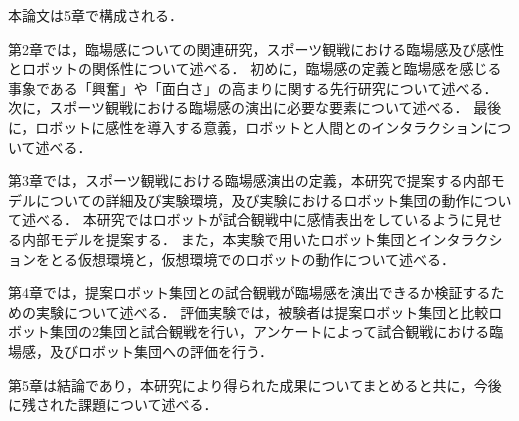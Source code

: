 本論文は5章で構成される．

第2章では，臨場感についての関連研究，スポーツ観戦における臨場感及び感性とロボットの関係性について述べる．
初めに，臨場感の定義と臨場感を感じる事象である「興奮」や「面白さ」の高まりに関する先行研究について述べる．
次に，スポーツ観戦における臨場感の演出に必要な要素について述べる．
最後に，ロボットに感性を導入する意義，ロボットと人間とのインタラクションについて述べる．

第3章では，スポーツ観戦における臨場感演出の定義，本研究で提案する内部モデルについての詳細及び実験環境，及び実験におけるロボット集団の動作について述べる．
本研究ではロボットが試合観戦中に感情表出をしているように見せる内部モデルを提案する．
また，本実験で用いたロボット集団とインタラクションをとる仮想環境と，仮想環境でのロボットの動作について述べる．

第4章では，提案ロボット集団との試合観戦が臨場感を演出できるか検証するための実験について述べる．
評価実験では，被験者は提案ロボット集団と比較ロボット集団の2集団と試合観戦を行い，アンケートによって試合観戦における臨場感，及びロボット集団への評価を行う．

第5章は結論であり，本研究により得られた成果についてまとめると共に，今後に残された課題について述べる．

